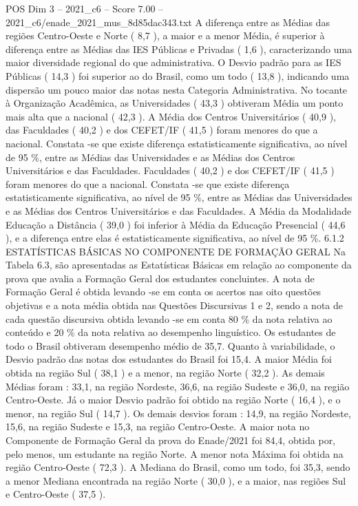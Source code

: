\begin{textsample}{POS Dim 3 – 2021\_c6 – Score 7.00 – 2021\_c6/enade\_2021\_mus\_8d85dac343.txt}
A diferença entre as Médias das regiões Centro-Oeste e Norte ( 8,7 ), a maior e a menor Média, é superior à diferença entre as Médias das IES Públicas e Privadas ( 1,6 ), caracterizando uma maior diversidade regional do que administrativa.
O Desvio padrão para as IES Públicas ( 14,3 ) foi superior ao do Brasil, como um todo ( 13,8 ), indicando uma dispersão um pouco maior das notas nesta Categoria Administrativa.
No tocante à Organização Acadêmica, as Universidades ( 43,3 ) obtiveram Média um ponto mais alta que a nacional ( 42,3 ).
A Média dos Centros Universitários ( 40,9 ), das Faculdades ( 40,2 ) e dos CEFET/IF ( 41,5 ) foram menores do que a nacional.
Constata -se que existe diferença estatisticamente significativa, ao nível de 95 \%, entre as Médias das Universidades e as Médias dos Centros Universitários e das Faculdades.
Faculdades ( 40,2 ) e dos CEFET/IF ( 41,5 ) foram menores do que a nacional.
Constata -se que existe diferença estatisticamente significativa, ao nível de 95 \%, entre as Médias das Universidades e as Médias dos Centros Universitários e das Faculdades.
A Média da Modalidade Educação a Distância ( 39,0 ) foi inferior à Média da Educação Presencial ( 44,6 ), e a diferença entre elas é estatisticamente significativa, ao nível de 95 \%. 6.1.2 ESTATÍSTICAS BÁSICAS NO COMPONENTE DE FORMAÇÃO GERAL Na Tabela 6.3, são apresentadas as Estatísticas Básicas em relação ao componente da prova que avalia a Formação Geral dos estudantes concluintes.
A nota de Formação Geral é obtida levando -se em conta os acertos nas oito questões objetivas e a nota média obtida nas Questões Discursivas 1 e 2, sendo a nota de cada questão discursiva obtida levando -se em conta 80 \% da nota relativa ao conteúdo e 20 \% da nota relativa ao desempenho linguístico.
Os estudantes de todo o Brasil obtiveram desempenho médio de 35,7.
Quanto à variabilidade, o Desvio padrão das notas dos estudantes do Brasil foi 15,4.
A maior Média foi obtida na região Sul ( 38,1 ) e a menor, na região Norte ( 32,2 ).
As demais Médias foram : 33,1, na região Nordeste, 36,6, na região Sudeste e 36,0, na região Centro-Oeste.
Já o maior Desvio padrão foi obtido na região Norte ( 16,4 ), e o menor, na região Sul ( 14,7 ).
Os demais desvios foram : 14,9, na região Nordeste, 15,6, na região Sudeste e 15,3, na região Centro-Oeste.
A maior nota no Componente de Formação Geral da prova do Enade/2021 foi 84,4, obtida por, pelo menos, um estudante na região Norte.
A menor nota Máxima foi obtida na região Centro-Oeste ( 72,3 ).
A Mediana do Brasil, como um todo, foi 35,3, sendo a menor Mediana encontrada na região Norte ( 30,0 ), e a maior, nas regiões Sul e Centro-Oeste ( 37,5 ).

\end{textsample}
